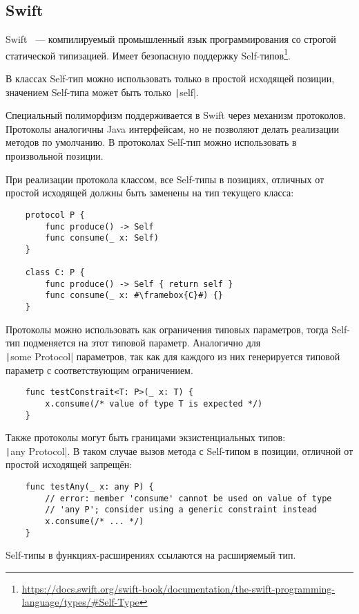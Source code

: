 \subsection{Swift}

Swift~\cite{goodwill2015swift} --- компилируемый промышленный язык программирования со строгой статической типизацией.
Имеет безопасную поддержку Self-типов\footnote{\url{https://docs.swift.org/swift-book/documentation/the-swift-programming-language/types/\#Self-Type}}.

В классах Self-тип можно использовать только в простой исходящей позиции, значением Self-типа может быть только \texttt|self|.

Специальный полиморфизм поддерживается в Swift через механизм протоколов.
Протоколы аналогичны Java интерфейсам, но не позволяют делать реализации методов по умолчанию.
В протоколах Self-тип можно использовать в произвольной позиции.

При реализации протокола классом, все Self-типы в позициях, отличных от простой исходящей должны быть заменены на тип текущего класса:

\begin{verbatim}
    protocol P {
        func produce() -> Self
        func consume(_ x: Self)
    }

    class C: P {
        func produce() -> Self { return self }
        func consume(_ x: #\framebox{C}#) {}
    }
\end{verbatim}

Протоколы можно использовать как ограничения типовых параметров, тогда Self-тип подменяется на этот типовой параметр.
Аналогично для \\\texttt|some Protocol| параметров, так как для каждого из них генерируется типовой параметр с соответствующим ограничением.

\begin{verbatim}
    func testConstrait<T: P>(_ x: T) {
        x.consume(/* value of type T is expected */)
    }
\end{verbatim}

Также протоколы могут быть границами экзистенциальных типов: \\\texttt|any Protocol|.
В таком случае вызов метода с Self-типом в позиции, отличной от простой исходящей запрещён:

\begin{verbatim}
    func testAny(_ x: any P) {
        // error: member 'consume' cannot be used on value of type
        // 'any P'; consider using a generic constraint instead
        x.consume(/* ... */)
    }
\end{verbatim}

Self-типы в функциях-расширениях ссылаются на расширяемый тип.

